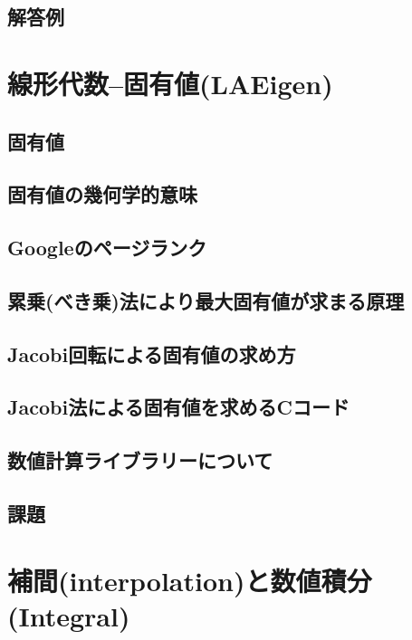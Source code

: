 \documentclass[10pt,a4j]{jsbook}
\begin{document}
\section{解答例}
 



\chapter{線形代数--固有値(LAEigen)}
\section{固有値}
 
\section{固有値の幾何学的意味}
 
\section{Googleのページランク}
 
\section{累乗(べき乗)法により最大固有値が求まる原理}
 
\section{Jacobi回転による固有値の求め方}
 
\section{Jacobi法による固有値を求めるCコード}
 
\section{数値計算ライブラリーについて}
 
\section{課題}
 

\chapter{補間(interpolation)と数値積分(Integral)}
\end{document}
